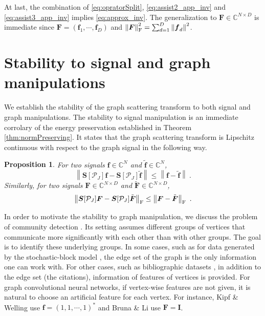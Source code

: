 \documentclass{article}
\newtheorem{proposition}[theorem]{Proposition}
\def\CC{\mathbb{C}}
\def\cP{\mathcal{P}}
\def\BF{\boldsymbol{F}}
\def\BI{\boldsymbol{I}}
\def\BS{\boldsymbol{S}}
\def\Bf{\boldsymbol{f}}
\newcommand{\F}{\textup{\mbox{F}}}
\newcommand{\norm}[1]{\left\lVert#1\right\rVert}
\begin{document}
At last, the combination of \eqref{eq:opratorSplit}, \eqref{eq:assist2_app_inv} and \eqref{eq:assist3_app_inv} implies \eqref{eq:approx_inv}. The generalization to $\BF \in \CC^{N \times D}$ is immediate since $\BF = (\Bf_1, \cdots, \Bf_D)$ and $\norm{\BF}_{\F}^2 = \sum_{d=1}^D \norm{\Bf_d}^2$.



\section{Stability to {signal and} graph manipulations}\label{sec:stability}
{We establish the stability of the graph scattering transform to both signal and graph manipulations. The stability to signal manipulation is an immediate corrolary of the energy preservation established in Theorem \ref{thm:normPreserving}. It states that the graph scattering transform is Lipschitz continuous with respect to the graph signal in the following way.}
{
\begin{proposition}
\label{cor:stabilitysignal}
For two signals $\Bf \in \CC^N$ and $\tilde{\Bf} \in \CC^N$,
\begin{equation}
\label{eq:prop5.1_1}
    \norm{ \BS[\cP_J] \Bf - \BS[\cP_J] \tilde{\Bf} } \leq \norm{ \Bf - \tilde{\Bf} } ~.
\end{equation}
Similarly, for two signals $\BF \in \CC^{N \times D}$ and $\tilde{\BF} \in \CC^{N \times D}$,
\begin{equation}
\label{eq:prop5.1_2}
    \norm{ \BS[\cP_J] \BF - \BS[\cP_J] \tilde{\BF} }_{\F} \leq \norm{ \BF - \tilde{\BF} }_{\F} ~.
\end{equation}
\end{proposition}
}

{In order to motivate the stability to graph manipulation, we discuss the problem of community detection \cite{For10}. Its setting assumes different groups of vertices that communicate more significantly with each other than with other groups. The goal is to identify these underlying groups.} In some cases, such as for data generated by the stochastic-block model \cite{Abb17}, the edge set of the graph is the only information one can work with. For other cases, such as bibliographic datasets \cite{SenNB08}, in addition to the edge set (the citations), information of features of vertices is provided. For graph convolutional neural networks, if vertex-wise features are not given, it is natural to choose an artificial feature for each vertex. For instance, Kipf \& Welling \cite{KipW16} use $\Bf = (1,1,\cdots,1)^*$ and Bruna \& Li \cite{BruL17} use $\BF = \BI$.
\end{document}
